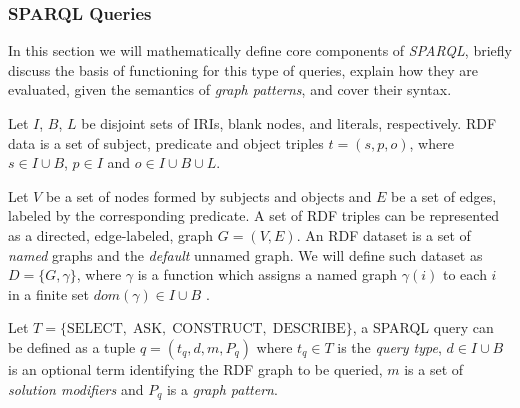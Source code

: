 \subsubsection{SPARQL Queries}
In this section we will mathematically define core components of \emph{SPARQL}, briefly discuss the basis of functioning for this type of queries, explain how they are evaluated, given the semantics of \emph{graph patterns}, and cover their syntax. 

\begin{definition} Let $I$, $B$, $L$ be disjoint sets of \gls{IRI}s, blank nodes, and literals, respectively. \gls{RDF} data is a set of subject, predicate and object triples $t = (s,p,o)$, where $s \in I \cup B$, $p \in I$ and $o \in I \cup B \cup L$. 

Let $V$ be a set of nodes formed by subjects and objects and $E$ be a set of edges, labeled by the corresponding predicate. A set of \gls{RDF} triples can be represented as a directed, edge-labeled, graph $G = (V, E)$. An \gls{RDF} dataset is a set of \emph{named} graphs and the \emph{default} unnamed graph. We will define such dataset as $D = \{G, \gamma\}$, where $\gamma$ is a function which assigns a named graph $\gamma(i)$ to each $i$ in a finite set $dom(\gamma) \in I \cup B$ \autocite{Picalausa2011-ca, noauthor_undated-ev}.
\end{definition}

\begin{definition} Let $T = \{\textrm{SELECT},\; \textrm{ASK},\; \textrm{CONSTRUCT},\;\textrm{DESCRIBE}\}$, a \gls{SPARQL} query can be defined as a tuple $q = (t_q,d,m,P_q)$ where $t_q \in T$ is the \emph{query type}, $d \in I \cup B$ is an optional term identifying the \gls{RDF} graph to be queried, $m$ is a set of \emph{solution modifiers} and $P_q$ is a \emph{graph pattern}.               
\end{definition}


